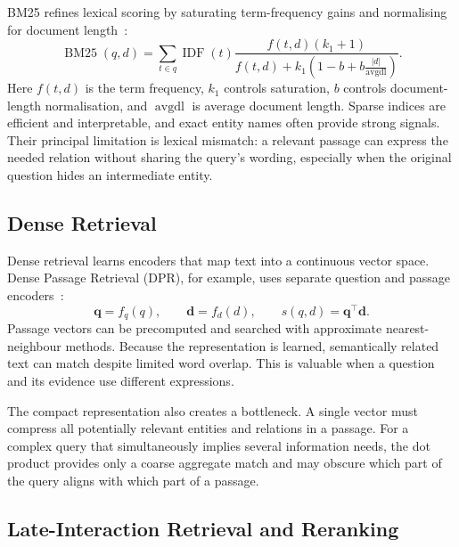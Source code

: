 BM25 refines lexical scoring by saturating term-frequency gains and normalising
for document length~\cite{robertson2009bm25}:
\begin{equation}
  \operatorname{BM25}(q,d)=
  \sum_{t\in q}\operatorname{IDF}(t)
  \frac{f(t,d)(k_1+1)}
  {f(t,d)+k_1\left(1-b+b\frac{|d|}{\operatorname{avgdl}}\right)}.
  \label{eq:bm25}
\end{equation}
Here \(f(t,d)\) is the term frequency, \(k_1\) controls saturation, \(b\)
controls document-length normalisation, and \(\operatorname{avgdl}\) is average
document length. Sparse indices are efficient and interpretable, and exact
entity names often provide strong signals. Their principal limitation is lexical
mismatch: a relevant passage can express the needed relation without sharing
the query's wording, especially when the original question hides an intermediate
entity.

\subsection{Dense Retrieval}
\label{subsec:dense-retrieval}

Dense retrieval learns encoders that map text into a continuous vector space.
Dense Passage Retrieval (DPR), for example, uses separate question and passage
encoders~\cite{karpukhin2020dpr}:
\begin{equation}
  \mathbf{q}=f_q(q),
  \qquad
  \mathbf{d}=f_d(d),
  \qquad
  s(q,d)=\mathbf{q}^{\top}\mathbf{d}.
  \label{eq:dpr}
\end{equation}
Passage vectors can be precomputed and searched with approximate nearest-neighbour
methods. Because the representation is learned, semantically related text can
match despite limited word overlap. This is valuable when a question and its
evidence use different expressions.

The compact representation also creates a bottleneck. A single vector must
compress all potentially relevant entities and relations in a passage. For a
complex query that simultaneously implies several information needs, the dot
product provides only a coarse aggregate match and may obscure which part of the
query aligns with which part of a passage.

\subsection{Late-Interaction Retrieval and Reranking}
\label{subsec:late-interaction}

